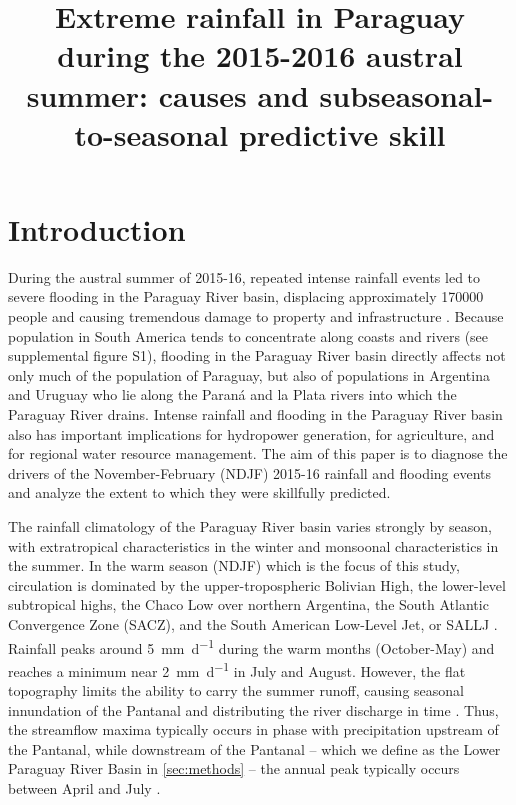 \documentclass[twocol]{ametsoc}
\title{Extreme rainfall in Paraguay during the 2015-2016 austral summer: causes and subseasonal-to-seasonal predictive skill}
\affiliation{Dept. of Earth and Environmental Engineering, Columbia University, 500 W. 120th St., New York, NY. USA \\ Columbia Water Center, Columbia University, 500 W. 120th St., New York, NY. USA}
\begin{document}
\maketitle


\section{Introduction}

During the austral summer of 2015-16, repeated intense rainfall events led to severe flooding in the Paraguay River basin, displacing approximately \num{170000} people \citep{BrackenridgeDFO} and causing tremendous damage to property and infrastructure \citep{MinisteriodeObrasPublicasyComunicacion:2016tq}.
Because population in South America tends to concentrate along coasts and rivers (see supplemental figure S1), flooding in the Paraguay River basin directly affects not only much of the population of Paraguay, but also of populations in Argentina and Uruguay who lie along the Paran\'{a} and la Plata rivers into which the Paraguay River drains.
Intense rainfall and flooding in the Paraguay River basin also has important implications for hydropower generation, for agriculture, and for regional water resource management.
The aim of this paper is to diagnose the drivers of the November-February (NDJF) 2015-16 rainfall and flooding events and analyze the extent to which they were skillfully predicted.

The rainfall climatology of the Paraguay River basin varies strongly by season, with extratropical characteristics in the winter and monsoonal characteristics in the summer.
In the warm season (NDJF) which is the focus of this study, circulation is dominated by the upper-tropospheric Bolivian High, the lower-level subtropical highs, the Chaco Low over northern Argentina, the South Atlantic Convergence Zone (SACZ), and the South American Low-Level Jet, or SALLJ \citep{Grimm2009,Marengo:2012cm}.
Rainfall peaks around \SI{5}{\milli\meter\per\day} during the warm months (October-May) and reaches a minimum near \SI{2}{\milli\meter\per\day} in July and August.
However, the flat topography limits the ability to carry the summer runoff, causing seasonal innundation of the Pantanal and distributing the river discharge in time \citep{Bravo:2011et,Barros:2004bn}.
Thus, the streamflow maxima typically occurs in phase with precipitation upstream of the Pantanal, while downstream of the Pantanal -- which we define as the Lower Paraguay River Basin in \cref{sec:methods} -- the annual peak typically occurs between April and July \citep{Barros:2004bn}.
\end{document}
